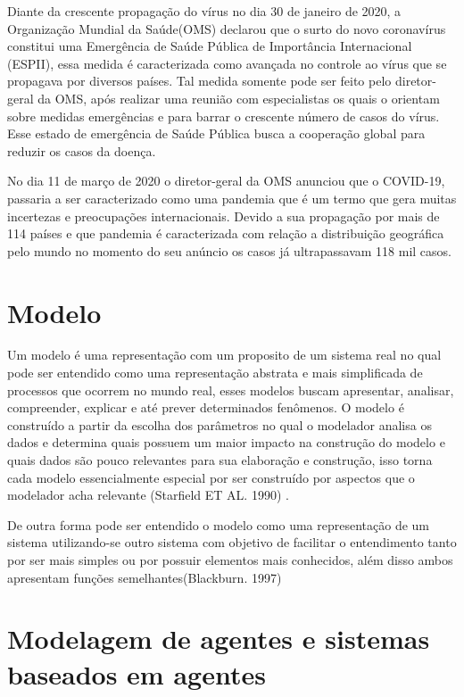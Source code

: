 Diante da crescente propagação do vírus no dia 30 de janeiro de 2020, a Organização Mundial da Saúde(OMS) declarou que o surto do novo coronavírus constitui uma Emergência de Saúde Pública de Importância Internacional (ESPII), essa medida é caracterizada como avançada no controle ao vírus que se propagava por diversos países. Tal medida somente pode ser feito pelo diretor-geral da OMS, após realizar uma reunião com especialistas os quais o orientam sobre medidas emergências e para barrar o crescente número de casos do vírus. Esse estado de emergência de Saúde Pública busca a cooperação global para reduzir os casos da doença.

No dia 11 de março de 2020 o diretor-geral da OMS anunciou que o COVID-19, passaria a ser caracterizado como uma pandemia que é um termo que gera muitas incertezas e preocupações internacionais. Devido a sua propagação por mais de 114 países e que pandemia é caracterizada com relação a distribuição geográfica pelo mundo  no momento do seu anúncio os casos já ultrapassavam 118 mil casos.

\section{Modelo}

Um modelo é uma representação com um proposito de um sistema real no qual pode ser entendido como uma representação abstrata e mais simplificada de processos que ocorrem no mundo real, esses modelos buscam apresentar, analisar, compreender, explicar e até prever determinados fenômenos. O modelo é construído a partir da escolha dos parâmetros no qual o modelador analisa os dados e determina quais possuem um maior impacto na construção do modelo e quais dados são pouco relevantes para sua elaboração e construção, isso torna cada modelo essencialmente especial por ser construído por aspectos que o modelador acha relevante (Starfield ET AL. 1990) \cite{Qualitat24:online}. 

De outra forma pode ser entendido o modelo como uma representação de um sistema utilizando-se outro sistema com objetivo de facilitar o entendimento tanto por ser mais simples ou por possuir elementos mais conhecidos, além disso ambos apresentam funções semelhantes(Blackburn. 1997)\cite{blackburn}

\section{Modelagem de agentes e sistemas baseados em agentes}

